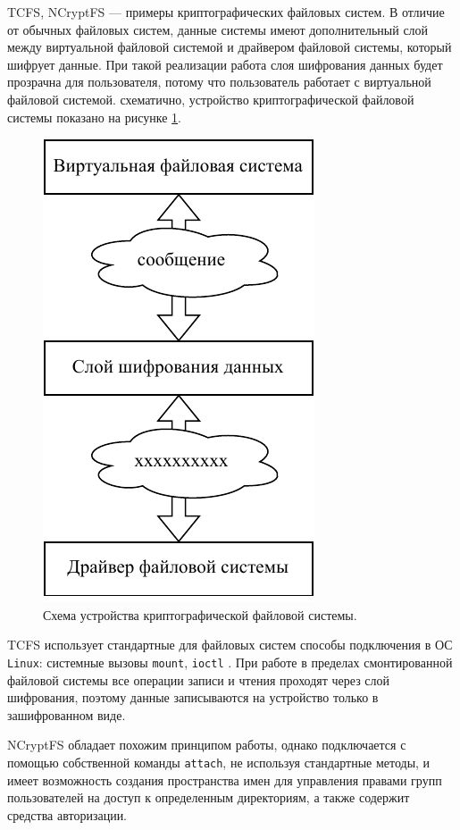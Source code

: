 TCFS\cite{tcfs}, NCryptFS\cite{ncryptfs} --- примеры криптографических файловых систем. В отличие от обычных файловых систем, данные системы имеют дополнительный слой между виртуальной файловой системой и драйвером файловой системы, который шифрует данные. При такой реализации работа слоя шифрования данных будет прозрачна для пользователя, потому что пользователь работает с виртуальной файловой системой. схематично, устройство криптографической файловой системы показано на рисунке \ref{fig:cryptfs}.

\begin{figure}[hbtp]
	\centering
	\includegraphics[scale=1]{img/cryptfs.pdf}
	\caption{Схема устройства криптографической файловой системы.}
	\label{fig:cryptfs}
\end{figure}

TCFS использует стандартные для файловых систем способы подключения в ОС \texttt{Linux}: системные вызовы \texttt{mount}, \texttt{ioctl} \cite{linux}. При работе в пределах смонтированной файловой системы все операции записи и чтения проходят через слой шифрования, поэтому данные записываются на устройство только в зашифрованном виде.

NCryptFS обладает похожим принципом работы, однако подключается с помощью собственной команды \texttt{attach}, не используя стандартные методы, и имеет возможность создания пространства имен для управления правами групп пользователей на доступ к определенным директориям, а также содержит средства авторизации.

